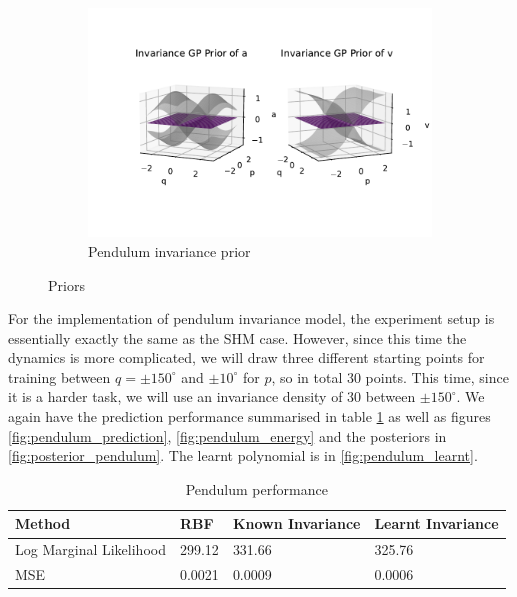 \documentclass{statsmsc}
\begin{document}
\begin{figure}[H]
     \hfill
     \begin{subfigure}[b]{0.8\linewidth}
         \centering
         \includegraphics[width=\linewidth]{../codes/figures/prior_pendulum_invariance.pdf}
         \caption{Pendulum invariance prior}
         \label{fig:prior_pendulum_invariance}
     \end{subfigure}
        \caption{Priors}
        \label{fig:priors}
\end{figure}

For the implementation of pendulum invariance model, the experiment setup is essentially exactly the same as the SHM case. 
However, since this time the dynamics is more complicated, we will draw three different starting points for training between $q=\pm 150^{\circ}$ and $\pm 10^{\circ}$ for $p$, so in total 30 points.
This time, since it is a harder task, we will use an invariance density of 30 between $\pm 150^{\circ}$.
We again have the prediction performance summarised in table \ref{tab:pendulum_performance} as well as figures \ref{fig:pendulum_prediction}, \ref{fig:pendulum_energy} and the posteriors in \ref{fig:posterior_pendulum}.
The learnt polynomial is in \ref{fig:pendulum_learnt}.

\begin{table}[H]
  \centering
  \begin{tabular}{ l l l l}
    \hline
Method           & RBF & Known Invariance&  Learnt Invariance\\
                    \hline
Log Marginal Likelihood & 299.12 & 331.66 & 325.76 \\
MSE & 0.0021 & 0.0009 & 0.0006 \\
    \hline
  \end{tabular}
  \caption{Pendulum performance}
  \label{tab:pendulum_performance}
\end{table}
\end{document}
